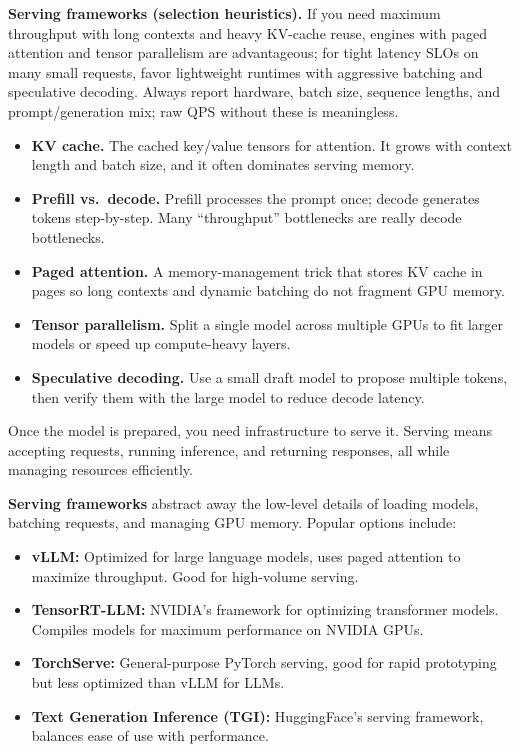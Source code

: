 \vspace{0.3cm}
\textbf{Serving frameworks (selection heuristics).} If you need maximum throughput with long contexts and heavy KV-cache reuse, engines with paged attention and tensor parallelism are advantageous; for tight latency SLOs on many small requests, favor lightweight runtimes with aggressive batching and speculative decoding. Always report hardware, batch size, sequence lengths, and prompt/generation mix; raw QPS without these is meaningless.

\begin{pausebox}[title=Serving jargon (one page)]
\begin{itemize}
\item \textbf{KV cache.} The cached key/value tensors for attention. It grows with context length and batch size, and it often dominates serving memory.
\item \textbf{Prefill vs.\ decode.} Prefill processes the prompt once; decode generates tokens step-by-step. Many ``throughput'' bottlenecks are really decode bottlenecks.
\item \textbf{Paged attention.} A memory-management trick that stores KV cache in pages so long contexts and dynamic batching do not fragment GPU memory.
\item \textbf{Tensor parallelism.} Split a single model across multiple GPUs to fit larger models or speed up compute-heavy layers.
\item \textbf{Speculative decoding.} Use a small draft model to propose multiple tokens, then verify them with the large model to reduce decode latency.
\end{itemize}
\end{pausebox}

Once the model is prepared, you need infrastructure to serve it. Serving means accepting requests, running inference, and returning responses, all while managing resources efficiently.

\textbf{Serving frameworks} abstract away the low-level details of loading models, batching requests, and managing GPU memory. Popular options include:

\begin{itemize}
\item \textbf{vLLM:} Optimized for large language models, uses paged attention to maximize throughput. Good for high-volume serving.
\item \textbf{TensorRT-LLM:} NVIDIA's framework for optimizing transformer models. Compiles models for maximum performance on NVIDIA GPUs.
\item \textbf{TorchServe:} General-purpose PyTorch serving, good for rapid prototyping but less optimized than vLLM for LLMs.
\item \textbf{Text Generation Inference (TGI):} HuggingFace's serving framework, balances ease of use with performance.
\end{itemize}

